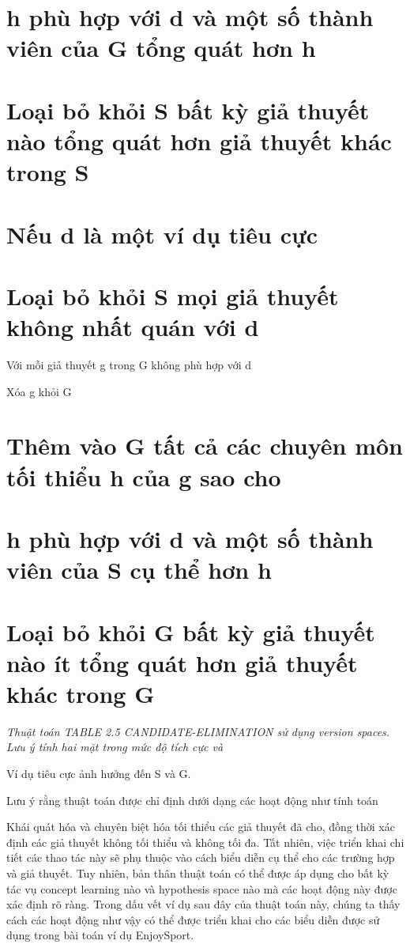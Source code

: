 \section{h phù hợp với d và một số thành viên của G tổng quát hơn h}

\section{Loại bỏ khỏi S bất kỳ giả thuyết nào tổng quát hơn giả thuyết khác trong S}

\section{Nếu d là một ví dụ tiêu cực}

\section{Loại bỏ khỏi S mọi giả thuyết không nhất quán với d}

Với mỗi giả thuyết g trong G không phù hợp với d

Xóa g khỏi G

\section{Thêm vào G tất cả các chuyên môn tối thiểu h của g sao cho}

\section{h phù hợp với d và một số thành viên của S cụ thể hơn h}

\section{Loại bỏ khỏi G bất kỳ giả thuyết nào ít tổng quát hơn giả thuyết khác trong G}

\noindent\textit{Thuật toán TABLE 2.5 CANDIDATE-ELIMINATION sử dụng version spaces. Lưu ý tính hai mặt trong mức độ tích cực và}

Ví dụ tiêu cực ảnh hưởng đến S và G.

Lưu ý rằng thuật toán được chỉ định dưới dạng các hoạt động như tính toán

Khái quát hóa và chuyên biệt hóa tối thiểu các giả thuyết đã cho, đồng thời xác định các giả thuyết không tối thiểu và không tối đa. Tất nhiên, việc triển khai chi tiết các thao tác này sẽ phụ thuộc vào cách biểu diễn cụ thể cho các trường hợp và giả thuyết. Tuy nhiên, bản thân thuật toán có thể được áp dụng cho bất kỳ tác vụ concept learning nào và hypothesis space nào mà các hoạt động này được xác định rõ ràng. Trong dấu vết ví dụ sau đây của thuật toán này, chúng ta thấy cách các hoạt động như vậy có thể được triển khai cho các biểu diễn được sử dụng trong bài toán ví dụ EnjoySport.

